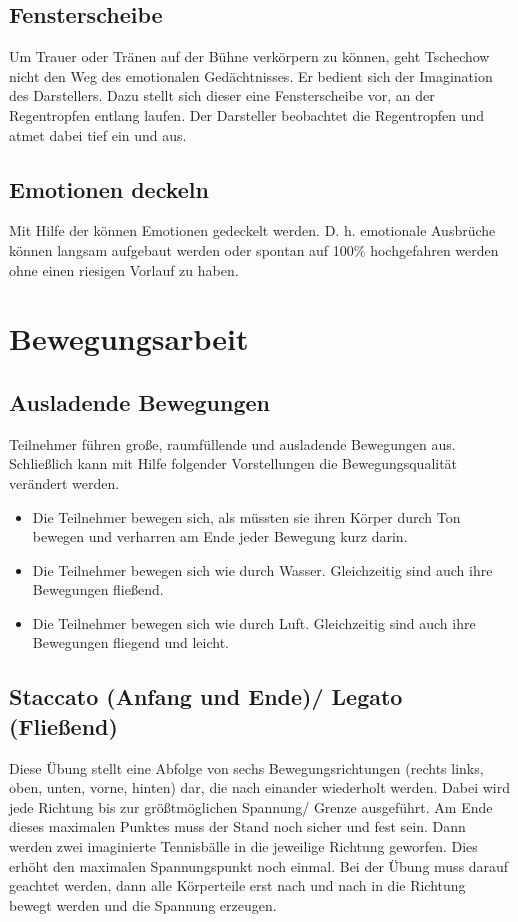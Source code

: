 \documentclass[ngerman, a4paper, twoside]{scrbook}%
\begin{document}
	\subsection{Fensterscheibe}
	Um Trauer oder Tränen auf der Bühne verkörpern zu können, geht Tschechow nicht den Weg des emotionalen Gedächtnisses. Er bedient sich der Imagination des Darstellers. Dazu stellt sich dieser eine Fensterscheibe vor, an der Regentropfen entlang laufen. Der Darsteller beobachtet die Regentropfen und atmet dabei tief ein und aus.
	\subsection{Emotionen deckeln}
	Mit Hilfe der  können Emotionen gedeckelt werden. D. h. emotionale Ausbrüche können langsam aufgebaut werden oder spontan auf 100\% hochgefahren werden ohne einen riesigen Vorlauf zu haben.


	\vspace{1cm}

	\section{Bewegungsarbeit}
	\subsection{Ausladende Bewegungen}
	Teilnehmer führen große, raumfüllende und ausladende Bewegungen aus. Schließlich kann mit Hilfe folgender Vorstellungen die Bewegungsqualität verändert werden.
	\begin{itemize}
		\item Die Teilnehmer bewegen sich, als müssten sie ihren Körper durch Ton bewegen und verharren am Ende jeder Bewegung kurz darin.
		\item Die Teilnehmer bewegen sich wie durch Wasser. Gleichzeitig sind auch ihre Bewegungen fließend.
		\item Die Teilnehmer bewegen sich wie durch Luft. Gleichzeitig sind auch ihre Bewegungen fliegend und leicht.
	\end{itemize}
	\subsection{Staccato (Anfang und Ende)/ Legato (Fließend)}
	Diese Übung stellt eine Abfolge von sechs Bewegungsrichtungen (rechts links, oben, unten, vorne, hinten) dar, die nach einander wiederholt werden. Dabei wird jede Richtung bis zur größtmöglichen Spannung/ Grenze ausgeführt. Am Ende dieses maximalen Punktes muss der Stand noch sicher und fest sein. Dann werden zwei imaginierte Tennisbälle in die jeweilige Richtung geworfen. Dies erhöht den maximalen Spannungspunkt noch einmal. Bei der Übung muss darauf geachtet werden, dann alle Körperteile erst nach und nach in die Richtung bewegt werden und die Spannung erzeugen.
\end{document}
